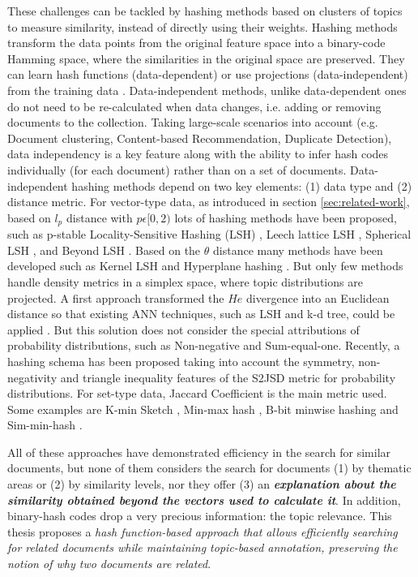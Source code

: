 These challenges can be tackled by hashing methods based on clusters of topics to measure similarity, instead of directly using their weights. Hashing methods transform the data points from the original feature space into a binary-code Hamming space, where the similarities in the original space are preserved. They can learn hash functions (data-dependent) or use projections (data-independent) from the training data \citep{Wang2016}. Data-independent methods, unlike data-dependent ones do not need to be re-calculated when data changes, i.e. adding or removing documents to the collection. Taking large-scale scenarios into account (e.g. Document clustering, Content-based Recommendation, Duplicate Detection), data independency is a key feature along with the ability to infer hash codes individually (for each document) rather than on a set of documents. Data-independent hashing methods depend on two key elements: (1) data type and (2) distance metric. For vector-type data, as introduced in section \ref{sec:related-work}, based on $l_p$ distance with $p \epsilon [0,2)$ lots of hashing methods have been proposed, such as p-stable Locality-Sensitive Hashing (LSH) \citep{Datar2004}, Leech lattice LSH \citep{Andoni2006}, Spherical LSH \citep{Terasawa2007}, and Beyond LSH \citep{Andoni2014}. Based on the $\theta$ distance many methods have been developed such as Kernel LSH \citep{Kulis2012} and Hyperplane hashing \citep{Vijayanarasimhan2014}. But only few methods handle density metrics in a simplex space, where topic distributions are projected. A first approach transformed the $He$ divergence into an Euclidean distance so that existing ANN techniques, such as LSH and k-d tree, could be applied \citep{Krstovski2013a}. But this solution does not consider the special attributions of probability distributions, such as Non-negative and Sum-equal-one. Recently, a hashing schema \citep{Mao2017} has been proposed taking into account the symmetry, non-negativity and triangle inequality features of the S2JSD metric for probability distributions. For set-type data, Jaccard Coefficient is the main metric used. Some examples are K-min Sketch \citep{Li2012}, Min-max hash \citep{Ji2013}, B-bit minwise hashing \citep{Li2010b} and Sim-min-hash \citep{Zhao2013}.

All of these approaches have demonstrated efficiency in the search for similar documents, but none of them considers the search for documents (1) by thematic areas or (2) by similarity levels, nor they offer (3) an \textbf{\textit{explanation about the similarity obtained beyond the vectors used to calculate it}}. In addition, binary-hash codes drop a very precious information: the topic relevance. This thesis proposes a \textit{hash function-based approach that allows efficiently searching for related documents while maintaining topic-based annotation, preserving the notion of why two documents are related}.


